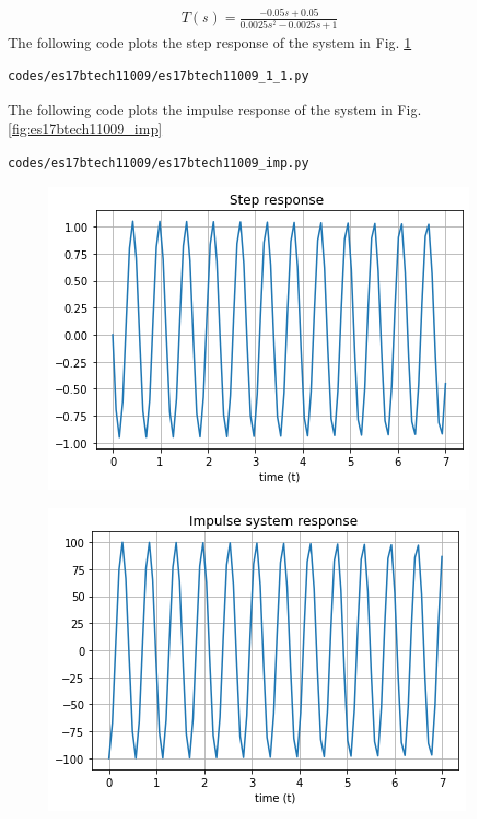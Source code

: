 \begin{enumerate}[label=\arabic*.,ref=\theenumi]
\begin{align}
    T(s) = \frac{-0.05s + 0.05}{0.0025s^2 - 0.0025s +1}
\end{align}
The following code plots the step response of the system  in Fig. \ref{fig:es17btech11009_1_1}
\begin{lstlisting}
codes/es17btech11009/es17btech11009_1_1.py
\end{lstlisting}
The following code plots the impulse response of the system  in Fig. \ref{fig:es17btech11009_imp}
\begin{lstlisting}
codes/es17btech11009/es17btech11009_imp.py
\end{lstlisting}
\renewcommand{\thefigure}{\theenumi.\arabic{figure}}
\begin{figure}[!ht]
\centering
\includegraphics[width=\columnwidth]{./figs/es17btech11009/es17btech11009_1_1.eps}
\caption{}
\label{fig:es17btech11009_1_1}
\end{figure}
\begin{figure}[!ht]
\centering
\includegraphics[width=\columnwidth]{./figs/es17btech11009/es17btech11009_imp.eps}

\end{figure}
\end{enumerate}
